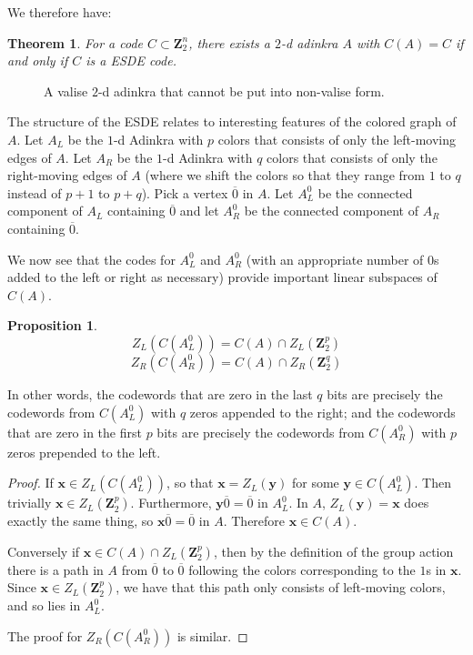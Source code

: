 \documentclass[12pt,twoside,singlespace]{article}
\numberwithin{equation}{section}
\newtheorem{thm}[equation]{Theorem}
\newtheorem{prop}[equation]{Proposition}
\theoremstyle{definition}
\newcommand{\ZZ}{\mathbf{Z}}
\renewcommand{\vec}[1]{\mathbf{#1}}
\begin{document}
We therefore have:
\begin{thm}
\label{thm:esde}
For a code $C \subset \ZZ_2^n$, there exists a $2$-d adinkra $A$ with $C(A) = C$ if and only if $C$ is a ESDE code.
\end{thm}

\begin{figure}[htb]
\begin{center}

\caption{A valise $2$-d adinkra that cannot be put into non-valise form.\label{fig:tight valise}}
\end{center}
\end{figure}

The structure of the ESDE relates to interesting features of the colored graph of $A$.  Let $A_L$ be the $1$-d Adinkra with $p$ colors that consists of only the left-moving edges of $A$.  Let $A_R$ be the $1$-d Adinkra with $q$ colors that consists of only the right-moving edges of $A$ (where we shift the colors so that they range from $1$ to $q$ instead of $p+1$ to $p+q$).  Pick a vertex $\overline{0}$ in $A$.  Let $A_L^0$ be the connected component of $A_L$ containing $\overline{0}$ and let $A_R^0$ be the connected component of $A_R$ containing $\overline{0}$.

We now see that the codes for $A_L^0$ and $A_R^0$ (with an appropriate number of $0$s added to the left or right as necessary) provide important linear subspaces of $C(A)$.

\begin{prop}
\[Z_L(C(A_L^0))=C(A)\cap Z_L(\ZZ_2^p)\]
\[Z_R(C(A_R^0))=C(A)\cap Z_R(\ZZ_2^q)\]
\end{prop}
In other words, the codewords that are zero in the last $q$ bits are precisely the codewords from $C(A_L^0)$ with $q$ zeros appended to the right; and the codewords that are zero in the first $p$ bits are precisely the codewords from $C(A_R^0)$ with $p$ zeros prepended to the left.
\begin{proof}
If $\vec{x}\in Z_L(C(A_L^0))$, so that $\vec{x}=Z_L(\vec{y})$ for some $\vec{y}\in C(A_L^0)$.  Then trivially $\vec{x}\in Z_L(\ZZ_2^p)$.  Furthermore, $\vec{y}\overline{0}=\overline{0}$ in $A_L^0$.  In $A$, $Z_L(\vec{y})=\vec{x}$ does exactly the same thing, so $\vec{x}\overline{0}=\overline{0}$ in $A$.  Therefore $\vec{x}\in C(A)$.

Conversely if $\vec{x}\in C(A)\cap Z_L(\ZZ_2^p)$, then by the definition of the group action there is a path in $A$ from $\overline{0}$ to $\overline{0}$ following the colors corresponding to the $1$s in $\vec{x}$.  Since $\vec{x}\in Z_L(\ZZ_2^p)$, we have that this path only consists of left-moving colors, and so lies in $A_L^0$.

The proof for $Z_R(C(A_R^0))$ is similar.
\end{proof}
\end{document}
